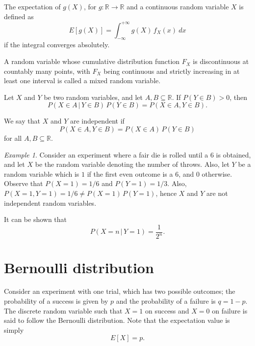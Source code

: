 \documentclass[11pt]{article}
\def\R{\mathbb{R}}
\newcommand\E[1]{E\left[#1\right]}
\theoremstyle{definition}
\theoremstyle{remark}
\newtheorem*{example}{Example}
\numberwithin{equation}{module}
\begin{document}
    \begin{definition}[Expectation]
        The expectation of $g(X)$, for $g\colon \R \to \R$ and a continuous random
        variable $X$ is defined as \[
            \E{g(X)} = \int_{-\infty}^{+\infty} g(X)\, f_X(x)\:dx
        \] if the integral converges absolutely.
    \end{definition}


    \begin{definition}
        A random variable whose cumulative distribution function $F_X$ is
        discontinuous at countably many points, with $F_X$ being continuous and
        strictly increasing in at least one interval is called a mixed random
        variable.
    \end{definition}

    \begin{definition}
        Let $X$ and $Y$ be two random variables, and let $A, B \subseteq \R$.
        If $P(Y \in B) > 0$, then \[
            P(X \in A \,|\, Y\in B)\, P(Y \in B) = P(X \in A, Y \in B).
        \] 
    \end{definition}
    \begin{definition}
        We say that $X$ and $Y$ are independent if \[
            P(X \in A, Y \in B) = P(X \in A)\, P(Y \in B)
        \] for all $A, B \subseteq \R$.
    \end{definition}

    \begin{example}
        Consider an experiment where a fair die is rolled until a 6 is obtained, and
        let $X$ be the random variable denoting the number of throws.  Also, let $Y$
        be a random variable which is $1$ if the first even outcome is a 6, and 0
        otherwise. Observe that $P(X = 1) = 1 / 6$ and $P(Y = 1) = 1 / 3$. Also,
        $P(X = 1, Y = 1) = 1 / 6 \neq P(X = 1)\, P(Y = 1)$, hence $X$ and $Y$ are
        not independent random variables.

        It can be shown that \[
            P(X = n \,|\, Y = 1) = \frac{1}{2^n}.
        \] 
    \end{example}

    \section*{Bernoulli distribution}
    Consider an experiment with one trial, which has two possible outcomes; the
    probability of a success is given by $p$ and the probability of a failure is $q
    = 1 - p$. The discrete random variable such that $X = 1$ on success and $X = 0$
    on failure is said to follow the Bernoulli distribution. Note that the
    expectation value is simply \[
        \E{X} = p.
    \] 
\end{document}

